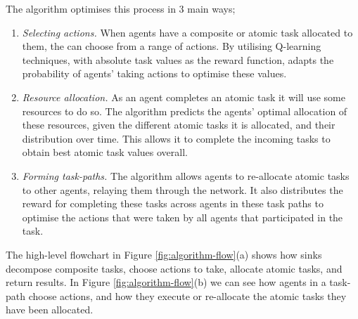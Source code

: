 The \acronymWSNOptimisation{}{} algorithm optimises this process  in 3 main ways;
\begin{enumerate}
	\item \textit{Selecting actions.} When agents have a composite or atomic task allocated to them, the can choose from a range of actions. By utilising Q-learning techniques, with absolute task values as the reward function, \acronymWSNOptimisation{}{} adapts the probability of agents' taking actions to optimise these values. 
	
	\item \textit{Resource allocation.} As an agent completes an atomic task it will use some resources to do so. The \acronymWSNOptimisation{}{} algorithm predicts the agents' optimal allocation of these resources, given the different atomic tasks it is allocated, and their distribution over time. This allows it to complete the incoming tasks to obtain best atomic task values overall.
	
	\item \textit{Forming task-paths. }The algorithm allows agents to re-allocate atomic tasks to other agents, relaying them through the network.  It also distributes the reward for completing these tasks across agents in these task paths to optimise the actions that were taken by all agents that participated in the task.
\end{enumerate}
The high-level flowchart in Figure \ref{fig:algorithm-flow}(a) shows how sinks decompose composite tasks, choose actions to take, allocate atomic tasks, and return results. In Figure \ref{fig:algorithm-flow}(b) we can see how agents in a task-path choose actions, and how they execute or re-allocate the atomic tasks they have been allocated.
